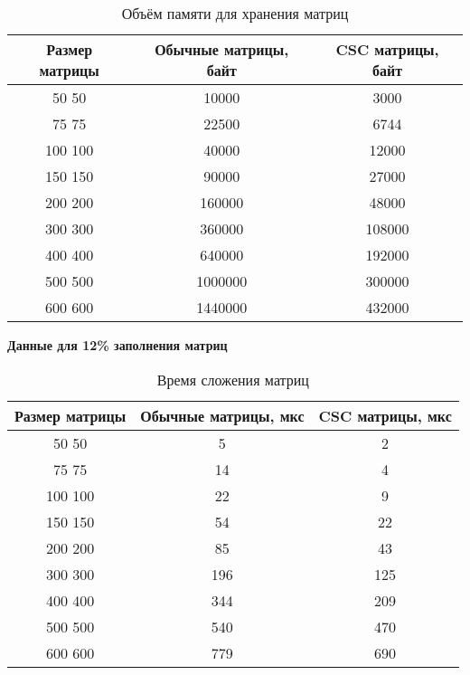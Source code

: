 \begin{table}[H]
	\centering
	\caption{Объём памяти для хранения матриц}
	\begin{tabular}{|c|c|c|}
		\hline
		Размер матрицы & Обычные матрицы, байт & CSC матрицы, байт \\ \hline
		50  50         & 10000                 & 3000             \\ \hline
		75  75         & 22500                 & 6744             \\ \hline
		100 100        & 40000                 & 12000            \\ \hline
		150 150        & 90000                 & 27000            \\ \hline
		200 200        & 160000                & 48000            \\ \hline
		300 300        & 360000                & 108000           \\ \hline
		400 400        & 640000                & 192000           \\ \hline
		500 500        & 1000000               & 300000           \\ \hline
		600 600        & 1440000               & 432000           \\ \hline
	\end{tabular}
\end{table}


\newpage
\textbf{Данные для 12\% заполнения матриц}
\begin{table}[H]
	\centering
	\caption{Время сложения матриц}
	\begin{tabular}{|c|c|c|}
		\hline
		Размер матрицы & Обычные матрицы, мкс & CSC матрицы, мкс \\ \hline
		50  50         & 5                    & 2                \\ \hline
		75  75         & 14                   & 4                \\ \hline
		100 100        & 22                   & 9                \\ \hline
		150 150        & 54                   & 22               \\ \hline
		200 200        & 85                   & 43               \\ \hline
		300 300        & 196                  & 125              \\ \hline
		400 400        & 344                  & 209              \\ \hline
		500 500        & 540                  & 470              \\ \hline
		600 600        & 779                  & 690              \\ \hline
	\end{tabular}
\end{table}


